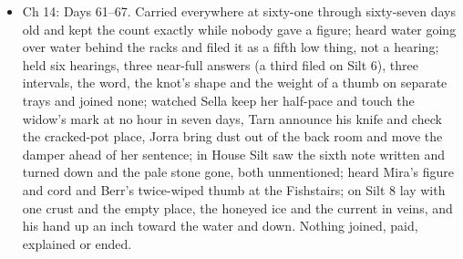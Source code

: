\documentclass{design/chronicle}
\begin{document}
{\begin{itemize}[leftmargin=1.4em,itemsep=1pt,topsep=3pt,parsep=0pt]
\item Ch 14: Days 61–67. Carried everywhere at sixty-one through sixty-seven days old and kept the count exactly while nobody gave a figure; heard water going over water behind the racks and filed it as a fifth low thing, not a hearing; held six hearings, three near-full answers (a third filed on Silt 6), three intervals, the word, the knot’s shape and the weight of a thumb on separate trays and joined none; watched Sella keep her half-pace and touch the widow’s mark at no hour in seven days, Tarn announce his knife and check the cracked-pot place, Jorra bring dust out of the back room and move the damper ahead of her sentence; in House Silt saw the sixth note written and turned down and the pale stone gone, both unmentioned; heard Mira’s figure and cord and Berr’s twice-wiped thumb at the Fishstairs; on Silt 8 lay with one crust and the empty place, the honeyed ice and the current in veins, and his hand up an inch toward the water and down. Nothing joined, paid, explained or ended.

\end{itemize}

\begin{itemize}[leftmargin=1.4em,itemsep=1pt,topsep=3pt,parsep=0pt]


\end{itemize}}
\end{document}
